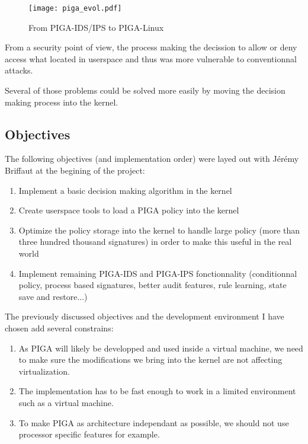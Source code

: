 \documentclass[pdftex,a4paper,titlepage,11pt]{article}
\begin{document}
\begin{figure}[h]
	\centering
	\texttt{[image: piga\_evol.pdf]}
	\caption{From PIGA-IDS/IPS to PIGA-Linux}
	\label{PIGAEVOL}
\end{figure}

\smallskip

From a security point of view, the process making the decission to allow or
deny access what located in userspace and thus was more vulnerable to
conventionnal attacks.

\bigskip

Several of those problems could be solved more easily by moving the decision
making process into the kernel.

\subsection{Objectives}

The following objectives (and implementation order) were layed out with Jérémy
Briffaut at the begining of the project:

\begin{enumerate}
	\item Implement a basic decision making algorithm in the kernel
	\item Create userspace tools to load a PIGA policy into the kernel
	\item Optimize the policy storage into the kernel to handle large policy
(more than three hundred thousand signatures) in order to make this useful in
the real world
	\item Implement remaining PIGA-IDS and PIGA-IPS fonctionnality (conditionnal
policy, process based signatures, better audit features, rule learning, state
save and restore...)
\end{enumerate}

\smallskip

The previously discussed objectives and the development environment I have
chosen add several constrains:

\begin{enumerate}
	\item As PIGA will likely be developped and used inside a virtual machine,
we need to make sure the modifications we bring into the kernel are not
affecting virtualization.
	\item The implementation has to be fast enough to work in a limited
environment such as a virtual machine.
	\item To make PIGA as architecture independant as possible, we should not
use processor specific features for example.
\end{enumerate}
\end{document}
